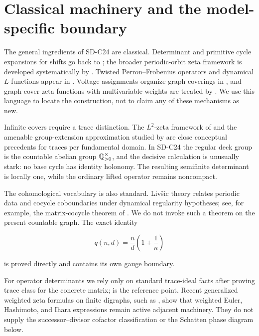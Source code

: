 \section{Classical machinery and the model-specific boundary}
\label{sec:classical}

The general ingredients of SD-C24 are classical.  Determinant and primitive
cycle expansions for shifts go back to \citet{BowenLanford1970}; the broader
periodic-orbit zeta framework is developed systematically by
\citet{ParryPollicott1990}.  Twisted Perron--Frobenius operators and dynamical
\(L\)-functions appear in \citet{AdachiSunada1987}.  Voltage assignments
organize graph coverings in \citet{GrossTucker1977}, and graph-cover zeta
functions with multivariable weights are treated by
\citet{StarkTerras1996}.  We use this language to locate the construction,
not to claim any of these mechanisms as new.

Infinite covers require a trace distinction.  The \(L^2\)-zeta framework of
\citet{Clair2009} and the amenable group-extension approximation studied by
\citet{Sharp2020} are close conceptual precedents for traces per fundamental
domain.  In SD-C24 the regular deck group is the countable abelian group
\(\mathbb Q_{>0}^{\times}\), and the decisive calculation is unusually stark: no
base cycle has identity holonomy.  The resulting semifinite determinant is
locally one, while the ordinary lifted operator remains noncompact.

The cohomological vocabulary is also standard.  Livšic theory relates
periodic data and cocycle coboundaries under dynamical regularity hypotheses;
see, for example, the matrix-cocycle theorem of \citet{Kalinin2011}.  We do
not invoke such a theorem on the present countable graph.  The exact identity

\[
 q(n,d)=\frac nd\left(1+\frac1n\right)
\]

is proved directly and contains its own gauge boundary.

For operator determinants we rely only on standard trace-ideal facts after
proving trace class for the concrete matrix; \citet{Simon1977} is the
reference point.  Recent generalized weighted zeta formulas on finite
digraphs, such as \citet{IshikawaMorita2026}, show that weighted Euler,
Hashimoto, and Ihara expressions remain active adjacent machinery.  They do
not supply the successor--divisor cofactor classification or the Schatten
phase diagram below.

